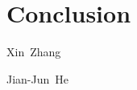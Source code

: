 \documentclass[10pt,final,journal,a4paper,twoside,twocolomn]{IEEEtran}
\begin{document}
\section{Conclusion}

\begin{thebibliography}{99}

\end{thebibliography}
\begin{IEEEbiographynophoto}{Xin~Zhang}

\end{IEEEbiographynophoto}

\begin{IEEEbiographynophoto}{Jian-Jun~He}

\end{IEEEbiographynophoto}
\end{document}
